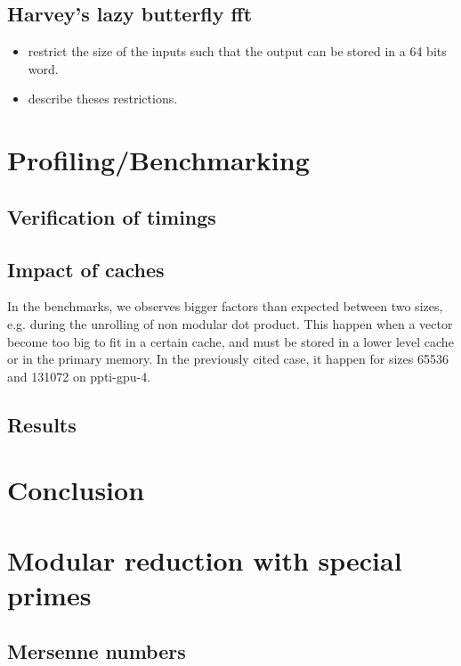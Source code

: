 \documentclass[a4paper]{article}
\begin{document}
\subsection{Harvey's lazy butterfly fft}

\begin{itemize}
    \item restrict the size of the inputs such that the output can be stored in a 64 bits word.
    \item describe theses restrictions.
\end{itemize}


\section{Profiling/Benchmarking}



\subsection{Verification of timings}

\subsection{Impact of caches} %

In the benchmarks, we observes bigger factors than expected between two sizes,
e.g. during the unrolling of non modular dot product. This happen when a vector
become too big to fit in a certain cache, and must be stored in a lower level
cache or in the primary memory. In the previously cited case, it happen for sizes
65536 and 131072 on ppti-gpu-4. %


\subsection{Results}

\section{Conclusion}

\section{Modular reduction with special primes}

\subsection{Mersenne numbers}
\end{document}
